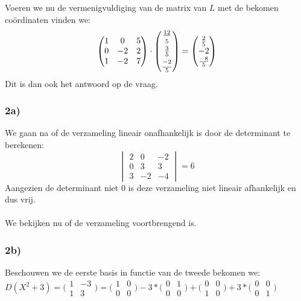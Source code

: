 \documentclass[lineaire_algebra_oplossingen.tex]{subfiles}
\begin{document}
Voeren we nu de vermenigvuldiging van de matrix van $L$ met de bekomen co\"ordinaten vinden we:\\
$$
\begin{pmatrix}
1&0&5\\
0&-2&2\\
1&-2&7
\end{pmatrix}
\cdot
\begin{pmatrix}
\frac{12}{\strut5}\\ \frac{3}{5}\\ \frac{\strut -2}{5}
\end{pmatrix}
=
\begin{pmatrix}
\strut \frac{2}{5}\\ -2\\ \strut \frac{-8}{5}
\end{pmatrix}
$$
Dit is dan ook het antwoord op de vraag.
\subsubsection*{2a)}
We gaan na of de verzameling lineair onafhankelijk is door de determinant te berekenen:
$$
\begin{vmatrix}
2 & 0 & -2\\
0&3&3\\
3&-2&-4
\end{vmatrix}
= 6
$$
Aangezien de determinant niet 0 is deze verzameling niet lineair afhankelijk en dus vrij.
\\
\\
We bekijken nu of de verzameling voortbrengend is.
\subsubsection*{2b)}

Beschouwen we de eerste basis in functie van de tweede bekomen we:\\

$D(X^2+3) = \bigl(
\begin{smallmatrix}
1&-3\\ 1&3
\end{smallmatrix}
\bigr) = \bigl(
\begin{smallmatrix}
1&0\\ 0&0
\end{smallmatrix}
\bigr) -3* \bigl(
\begin{smallmatrix}
0&1\\ 0&0
\end{smallmatrix}
\bigr) + \bigl(
\begin{smallmatrix}
0&0\\ 1&0
\end{smallmatrix}
\bigr) +3* \bigl(
\begin{smallmatrix}
0&0\\ 0&1
\end{smallmatrix}
\bigr)$\\
\end{document}
